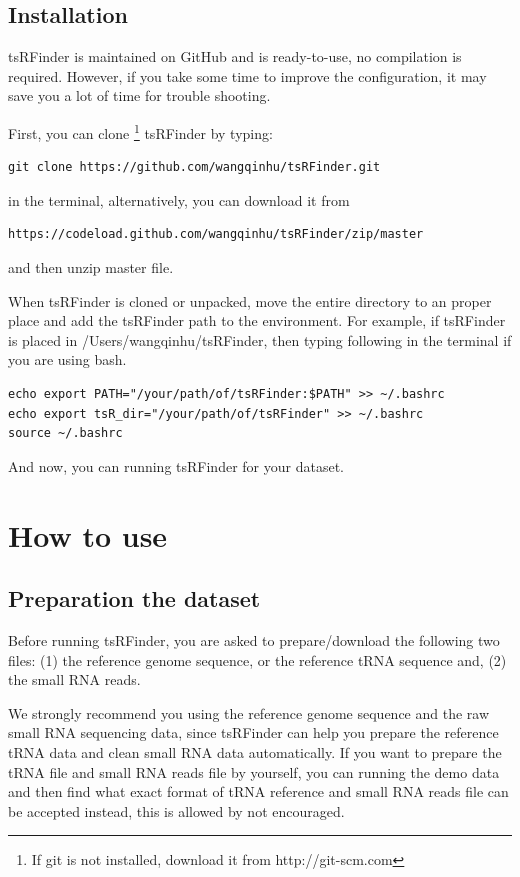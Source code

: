 \documentclass[11pt, a4paper]{article}
\begin{document}
\subsection{Installation}

tsRFinder is maintained on GitHub and is ready-to-use, no compilation is required. However, if you take some time to improve the configuration, it may save you a lot of time for trouble shooting.

First, you can clone \footnote{If git is not installed, download it from http://git-scm.com} tsRFinder by typing:

{\small \begin{verbatim}
git clone https://github.com/wangqinhu/tsRFinder.git
\end{verbatim}}

in the terminal, alternatively, you can download it from

{\small \begin{verbatim}
https://codeload.github.com/wangqinhu/tsRFinder/zip/master
\end{verbatim}
}

and then unzip master file.

When tsRFinder is cloned or unpacked, move the entire directory to an proper place and add the tsRFinder path to the environment. For example, if tsRFinder is placed in /Users/wangqinhu/tsRFinder, then typing following in the terminal if you are using bash.

{\small \begin{verbatim}
echo export PATH="/your/path/of/tsRFinder:$PATH" >> ~/.bashrc
echo export tsR_dir="/your/path/of/tsRFinder" >> ~/.bashrc
source ~/.bashrc
\end{verbatim}}

And now, you can running tsRFinder for your dataset.

\section{How to use}

\subsection{Preparation the dataset}

Before running tsRFinder, you are asked to prepare/download the following two files: (1) the reference genome sequence, or the reference tRNA sequence and, (2) the small RNA reads.

We strongly recommend you using the reference genome sequence and the raw small RNA sequencing data, since tsRFinder can help you prepare the reference tRNA data and clean small RNA data automatically. If you want to prepare the tRNA file and small RNA reads file by yourself, you can running the demo data and then find what exact format of tRNA reference and small RNA reads file can be accepted instead, this is allowed by not encouraged. 
\end{document}
